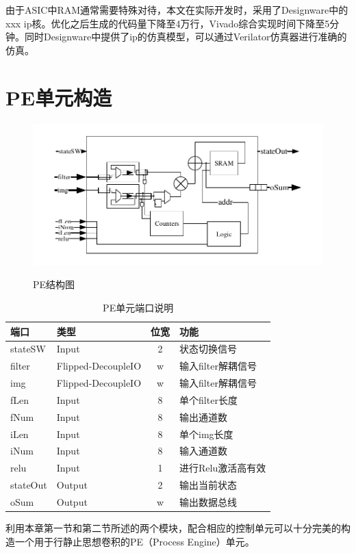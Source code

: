 由于ASIC中RAM通常需要特殊对待，本文在实际开发时，采用了Designware中的xxx ip核。优化之后生成的代码量下降至4万行，Vivado综合实现时间下降至5分钟。同时Designware中提供了ip的仿真模型，可以通过Verilator仿真器进行准确的仿真。


\section{PE单元构造}
\begin{figure}[h]
    \centering
    \includegraphics{../pdf/PE.pdf}\\
    \caption{PE结构图}
\end{figure}
\begin{table}[h] %
    \centering
    \caption{PE单元端口说明} %
    \begin{tabular}{l|l|c|l} %
    \hline  
    \hline  
    端口 & 类型 & 位宽 & 功能 \\ %
    \hline %
    stateSW & Input & 2 & 状态切换信号 \\
    \hline  
    filter & Flipped-DecoupleIO & w & 输入filter解耦信号 \\
    \hline  
    img & Flipped-DecoupleIO & w & 输入filter解耦信号 \\
    \hline  
    fLen & Input & 8 & 单个filter长度 \\
    \hline  
    fNum & Input & 8 & 输出通道数 \\
    \hline  
    iLen & Input & 8 & 单个img长度 \\
    \hline  
    iNum & Input & 8 & 输入通道数 \\
    \hline  
    relu & Input & 1 & 进行Relu激活高有效 \\
    \hline  
    stateOut & Output & 2 & 输出当前状态 \\
    \hline  
    oSum & Output & w & 输出数据总线 \\
    \hline  
    \hline  
    \end{tabular}  
\end{table}  
利用本章第一节和第二节所述的两个模块，配合相应的控制单元可以十分完美的构造一个用于行静止思想卷积的PE（Process Engine）单元。

